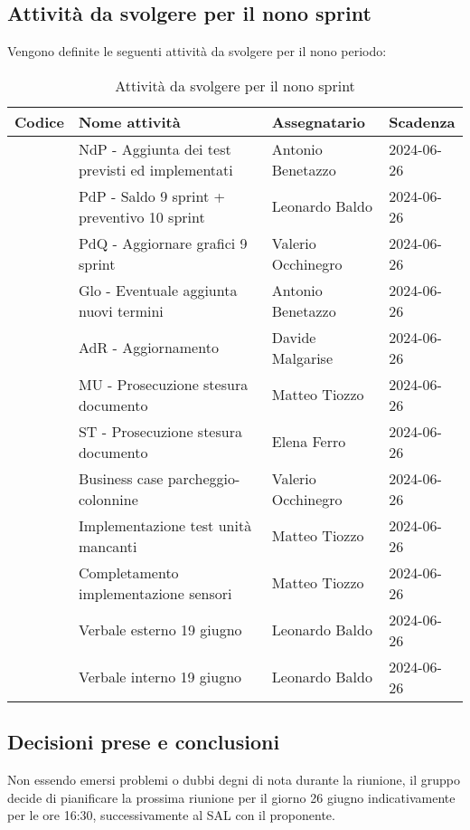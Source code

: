\documentclass[italian,12pt]{article}
\begin{document}
\newpage

\subsection{Attività da svolgere per il nono sprint}
Vengono definite le seguenti attività da svolgere per il nono periodo:
\begin{table}[!h]
	\centering
	\begin{tabular}{ |l||p{7cm}|l|l| }
		\hline
		\textbf{Codice}          & \textbf{Nome attività}                           & \textbf{Assegnatario} & \textbf{Scadenza} \\
		\hline
		\mySkip[86bz8e28m]       & NdP - Aggiunta dei test previsti ed implementati & Antonio Benetazzo     & 2024-06-26        \\
		\mySkip[86bz8e6cp]       & PdP - Saldo 9 sprint + preventivo 10 sprint      & Leonardo Baldo        & 2024-06-26        \\
		\mySkip[86bz8e4ac]       & PdQ - Aggiornare grafici 9 sprint                & Valerio Occhinegro    & 2024-06-26        \\
		\mySkip[86bz8e8g5]       & Glo - Eventuale aggiunta nuovi termini           & Antonio Benetazzo     & 2024-06-26        \\
		\mySkip[86bz8e13d]       & AdR - Aggiornamento                              & Davide Malgarise      & 2024-06-26        \\
		\mySkip[86bz8e2ja]       & MU - Prosecuzione stesura documento              & Matteo Tiozzo         & 2024-06-26        \\
		\mySkip[86bz8e3xn]       & ST - Prosecuzione stesura documento              & Elena Ferro           & 2024-06-26        \\
		\mySkip[86bz8dzy0]       & Business case parcheggio-colonnine               & Valerio Occhinegro    & 2024-06-26        \\
		\mySkip[86bz8dzzg]       & Implementazione test unità mancanti              & Matteo Tiozzo         & 2024-06-26        \\
		\mySkip[86byzyxdr]       & Completamento implementazione sensori            & Matteo Tiozzo         & 2024-06-26        \\
		\mySkip[86bz9gj8r]       & Verbale esterno 19 giugno                        & Leonardo Baldo        & 2024-06-26        \\
		\mySkip[86bz9gjd9]       & Verbale interno 19 giugno                        & Leonardo Baldo        & 2024-06-26        \\
		\hline
	\end{tabular}
	\caption{Attività da svolgere per il nono sprint}
\end{table}

\subsection{Decisioni prese e conclusioni}
Non essendo emersi problemi o dubbi degni di nota durante la riunione, il gruppo decide di pianificare la prossima riunione per il giorno 26 giugno indicativamente per le ore 16:30, successivamente al SAL con il proponente.
\end{document}
